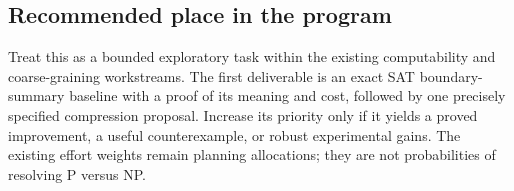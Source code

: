 \documentclass[11pt]{article}
\theoremstyle{definition}
\theoremstyle{plain}
\theoremstyle{remark}
\begin{document}
\subsection{Recommended place in the program}

Treat this as a bounded exploratory task within the existing computability and coarse-graining workstreams. The first deliverable is an exact SAT boundary-summary baseline with a proof of its meaning and cost, followed by one precisely specified compression proposal. Increase its priority only if it yields a proved improvement, a useful counterexample, or robust experimental gains. The existing effort weights remain planning allocations; they are not probabilities of resolving P versus NP.
\end{document}
